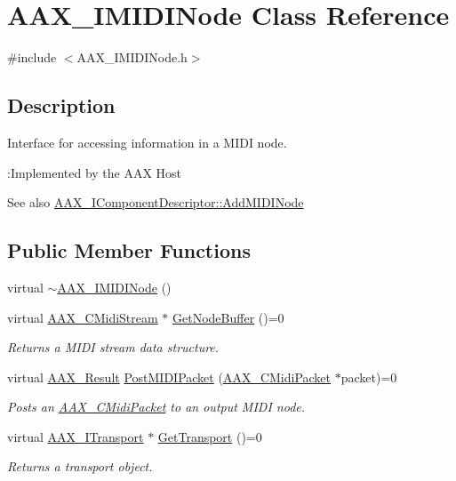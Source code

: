 \hypertarget{a01845}{}\section{A\+A\+X\+\_\+\+I\+M\+I\+D\+I\+Node Class Reference}
\label{a01845}


{\ttfamily \#include $<$A\+A\+X\+\_\+\+I\+M\+I\+D\+I\+Node.\+h$>$}



\subsection{Description}
Interface for accessing information in a M\+I\+DI node. 

\begin{DoxyRefDesc}{\+:\+Implemented by the A\+A\+X Host}
\item[\mbox{\hyperlink{a00790__aax_host_implementation000009}{\+:\+Implemented by the A\+A\+X Host}}]\end{DoxyRefDesc}


\begin{DoxySeeAlso}{See also}
\mbox{\hyperlink{a01781_a6284dda9ccca898e33075de29dad4e39}{A\+A\+X\+\_\+\+I\+Component\+Descriptor\+::\+Add\+M\+I\+D\+I\+Node}} 
\end{DoxySeeAlso}
\subsection*{Public Member Functions}
\begin{DoxyCompactItemize}
\item 
virtual \mbox{\hyperlink{a01845_ad9b4ebff12e979094504e8630f7b861a}{$\sim$\+A\+A\+X\+\_\+\+I\+M\+I\+D\+I\+Node}} ()
\item 
virtual \mbox{\hyperlink{a01433}{A\+A\+X\+\_\+\+C\+Midi\+Stream}} $\ast$ \mbox{\hyperlink{a01845_a794f1c0d19ac6720382c23b0a4dc2b17}{Get\+Node\+Buffer}} ()=0
\begin{DoxyCompactList}\small\item\em Returns a M\+I\+DI stream data structure. \end{DoxyCompactList}\item 
virtual \mbox{\hyperlink{a00392_a4d8f69a697df7f70c3a8e9b8ee130d2f}{A\+A\+X\+\_\+\+Result}} \mbox{\hyperlink{a01845_a5e1c5409158164f57376f908c9693a8b}{Post\+M\+I\+D\+I\+Packet}} (\mbox{\hyperlink{a01429}{A\+A\+X\+\_\+\+C\+Midi\+Packet}} $\ast$packet)=0
\begin{DoxyCompactList}\small\item\em Posts an \mbox{\hyperlink{a01429}{A\+A\+X\+\_\+\+C\+Midi\+Packet}} to an output M\+I\+DI node. \end{DoxyCompactList}\item 
virtual \mbox{\hyperlink{a01885}{A\+A\+X\+\_\+\+I\+Transport}} $\ast$ \mbox{\hyperlink{a01845_a57bd132ee74047e25298b157c0bff2f9}{Get\+Transport}} ()=0
\begin{DoxyCompactList}\small\item\em Returns a transport object. \end{DoxyCompactList}\end{DoxyCompactItemize}


